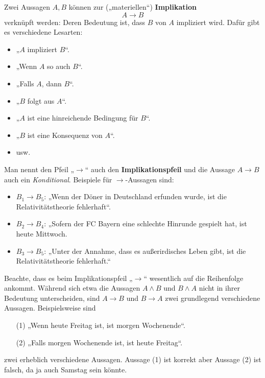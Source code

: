 	\begin{de}[Implikationspfeil]
Zwei Aussagen $A,B$ können zur („materiellen“) \textbf{Implikation}
\[ A\to B \]
verknüpft werden: Deren Bedeutung ist, dass $B$ von $A$ impliziert wird. Dafür gibt es verschiedene Lesarten:
\begin{itemize}
\item „$A$ impliziert $B$“.
 \item „Wenn $A$ so auch $B$“.
 \item „Falls $A$, dann $B$“.
 \item „$B$ folgt aus $A$“.
 \item „$A$ ist eine hinreichende Bedingung für $B$“.
 \item „$B$ ist eine Konsequenz von $A$“.
 \item usw.
\end{itemize}
Man nennt den Pfeil „$\to$“ auch den \textbf{Implikationspfeil} und die Aussage $A\to B$ auch ein \emph{Konditional}. Beispiele für $\to$-Aussagen sind:
\begin{itemize}
 \item $B_1\to B_5$: „Wenn der Döner in Deutschland erfunden wurde, ist die Relativitätstheorie fehlerhaft“.
 \item $B_2\to B_4$: „Sofern der FC Bayern eine schlechte Hinrunde gespielt hat, ist heute Mittwoch.
 \item $B_3\to B_5$: „Unter der Annahme, dass es außerirdisches Leben gibt, ist die Relativitätstheorie fehlerhaft.“
\end{itemize}
Beachte, dass es beim Implikationspfeil „$\to$“ wesentlich auf die Reihenfolge ankommt. Während sich etwa die Aussagen $A\land B$ und $B\land A$ nicht in ihrer Bedeutung unterscheiden, sind $A\to B$ und $B\to A$ zwei grundlegend verschiedene Aussagen. Beispielsweise sind
\begin{itemize}
 \item[(1)] „Wenn heute Freitag ist, ist morgen Wochenende“.
 \item[(2)] „Falls morgen Wochenende ist, ist heute Freitag“.
\end{itemize}
zwei erheblich verschiedene Aussagen. Aussage (1) ist korrekt aber Aussage (2) ist falsch, da ja auch Samstag sein könnte.
\end{de}
